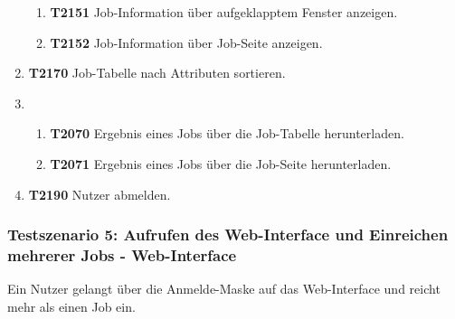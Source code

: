 \begin{enumerate}
\begin{enumerate}
        \item \textbf{T2151} Job-Information über aufgeklapptem Fenster anzeigen.
         
        \item \textbf{T2152} Job-Information über Job-Seite anzeigen. 
    \end{enumerate}
    
    \item \textbf{T2170} Job-Tabelle nach Attributen sortieren.
    
    \item
    \begin{enumerate}
        \item \textbf{T2070} Ergebnis eines Jobs über die Job-Tabelle herunterladen.
        
        \item \textbf{T2071} Ergebnis eines Jobs über die Job-Seite herunterladen. 
    \end{enumerate}
    
    \item \textbf{T2190} Nutzer abmelden.

\end{enumerate}

\subsubsection{Testszenario 5: Aufrufen des Web-Interface und Einreichen mehrerer Jobs - Web-Interface}
Ein Nutzer gelangt über die Anmelde-Maske auf das Web-Interface und reicht mehr als einen Job ein.

